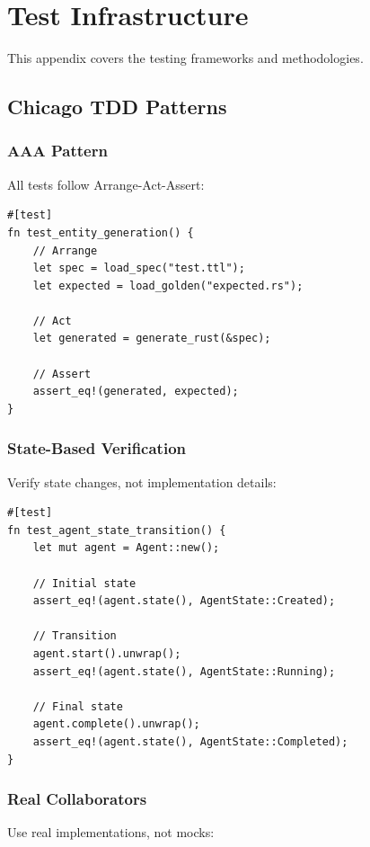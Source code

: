 \chapter{Test Infrastructure}

This appendix covers the testing frameworks and methodologies.

\section{Chicago TDD Patterns}

\subsection{AAA Pattern}

All tests follow Arrange-Act-Assert:

\begin{verbatim}
#[test]
fn test_entity_generation() {
    // Arrange
    let spec = load_spec("test.ttl");
    let expected = load_golden("expected.rs");

    // Act
    let generated = generate_rust(&spec);

    // Assert
    assert_eq!(generated, expected);
}
\end{verbatim}

\subsection{State-Based Verification}

Verify state changes, not implementation details:

\begin{verbatim}
#[test]
fn test_agent_state_transition() {
    let mut agent = Agent::new();

    // Initial state
    assert_eq!(agent.state(), AgentState::Created);

    // Transition
    agent.start().unwrap();
    assert_eq!(agent.state(), AgentState::Running);

    // Final state
    agent.complete().unwrap();
    assert_eq!(agent.state(), AgentState::Completed);
}
\end{verbatim}

\subsection{Real Collaborators}

Use real implementations, not mocks:

